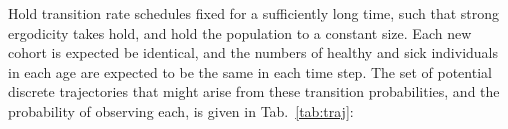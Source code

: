 \documentclass[12pt,oneside,a4paper]{article}
\theoremstyle{definition}
\newcommand{\vb}[1]{\texttt{#1}}
\begin{document}
\noindent Hold transition rate schedules fixed for a sufficiently long time, such that strong ergodicity takes hold, and hold the population to a constant size. Each new cohort is expected be identical, and the numbers of healthy and sick individuals in each age are expected to be the same in each time step. The set of potential discrete trajectories that might arise from these transition probabilities, and the probability of observing each, is given in Tab.~\ref{tab:traj}:

\end{document}
